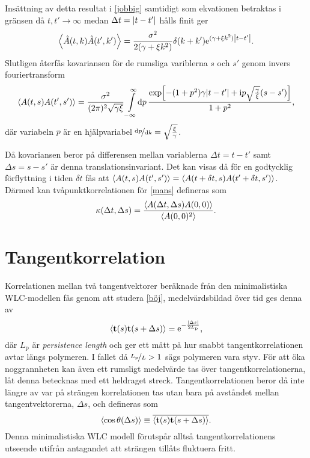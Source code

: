 Insättning av detta resultat i \eqref{jobbig} samtidigt som ekvationen betraktas i gränsen då $t, t'\rightarrow\infty$ medan $\Delta t=\abs{t-t'}$ hålls finit ger
\begin{equation}
    \ev{\hat{A}(t,k)\hat{A}(t',k')}=\frac{\sigma^2}{2(\gamma+\xi k^2)}\delta(k+k')\ee^{(\gamma+\xi k^2)\abs{t-t'}}.
\end{equation}
Slutligen återfås kovariansen för de rumsliga variblerna $s$ och $s'$ genom invers fouriertransform
\begin{equation}
\label{2korr}
    \ev{A(t,s)A(t',s')}=\frac{\sigma^2}{(2\pi)^2\sqrt{\gamma\xi}}\int_{-\infty}^{\infty}\!\dd{p} \frac{\exp[-(1+p^2)\gamma \abs{t-t'}+\ii p\sqrt{\frac{\gamma}{\xi}}(s-s')]}{1+p^2},
\end{equation}
där variabeln $p$ är en hjälpvariabel $\nicefrac{\dd{p}}{\dd{k}}=\sqrt{\frac{\xi}{\gamma}}$. 

Då kovariansen beror på differensen mellan variablerna $\Delta t=t-t'$ samt $\Delta s=s-s'$ är denna translationsinvariant. Det kan visas då för en godtycklig förflyttning i tiden $\delta{t}$ fås att $\ev{A(t,s)A(t',s')}=\ev{A(t+\delta t,s)A(t'+\delta t,s')}$. Därmed kan tvåpunktkorrelationen för \eqref{mans} defineras som
\begin{equation}
    \kappa (\Delta t,\Delta s)=\frac{\ev{A(\Delta t,\Delta s)A(0,0)}}{\ev{A(0,0)^2}}.
\end{equation}







\section{Tangentkorrelation}


Korrelationen mellan två tangentvektorer beräknade från den minimalistiska WLC-modellen fås genom att studera \eqref{böj}, medelvärdsbildad över tid ges denna av \cite{Landau1958}
\begin{equation}
\ev{\textbf{t}(s)\textbf{t}(s+\Delta s)}=\ee^{-\frac{\abs{\Delta s}}{2L_\text{p}}},
\end{equation}
där $L_\text{p}$ är \emph{persistence length} och ger ett mått på hur snabbt tangentkorrelationen avtar längs polymeren. I fallet då $\nicefrac{L_\text{p}}{L}>1$ sägs polymeren vara styv. 
För att öka noggrannheten kan även ett rumsligt medelvärde tas över tangentkorrelationerna, låt denna betecknas med ett heldraget streck. Tangentkorrelationen beror då inte längre av var på strängen korrelationen tas utan bara på avståndet mellan tangentvektorerna, $\Delta s$, och defineras som
\begin{equation}
\label{tangkorr}
    \ev{\cos\theta(\Delta s)}\equiv\overline{\ev{\mathbf{t}(s)\mathbf{t}(s+\Delta s)}}.
\end{equation}
Denna minimalistiska WLC modell förutspår alltså tangentkorrelationens utseende utifrån antagandet att strängen tillåts fluktuera fritt.


